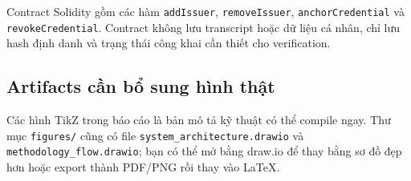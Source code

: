 Contract Solidity gồm các hàm \texttt{addIssuer}, \texttt{removeIssuer}, \texttt{anchorCredential} và \texttt{revokeCredential}. Contract không lưu transcript hoặc dữ liệu cá nhân, chỉ lưu hash định danh và trạng thái công khai cần thiết cho verification.

\subsection{Artifacts cần bổ sung hình thật}

Các hình TikZ trong báo cáo là bản mô tả kỹ thuật có thể compile ngay. Thư mục \texttt{figures/} cũng có file \texttt{system\_architecture.drawio} và \texttt{methodology\_flow.drawio}; bạn có thể mở bằng draw.io để thay bằng sơ đồ đẹp hơn hoặc export thành PDF/PNG rồi thay vào LaTeX.
